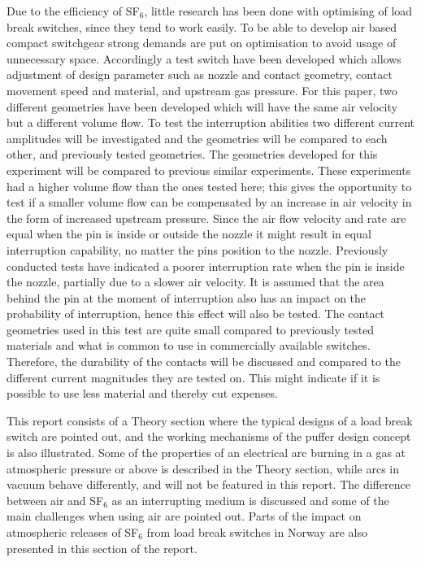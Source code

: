 \documentclass[10pt,a4paper,twoside]{article}
\begin{document}
Due to the efficiency of SF$_6$, little research has been done with optimising of load break switches, since they tend to work easily. To be able to develop air based compact switchgear strong demands are put on optimisation to avoid usage of unnecessary space. Accordingly a test switch have been developed which allows adjustment of design parameter such as nozzle and contact geometry, contact movement speed and material, and upstream gas pressure. For this paper, two different geometries have been developed which will have the same air velocity but a different volume flow. To test the interruption abilities two different current amplitudes will be investigated and the geometries will be compared to each other, and previously tested geometries. The geometries developed for this experiment will be compared to previous similar experiments. These experiments had a higher volume flow than the ones tested here; this gives the opportunity to test if a smaller volume flow can be compensated by an increase in air velocity in the form of increased upstream pressure. Since the air flow velocity and rate are equal when the pin is inside or outside the nozzle it might result in equal interruption capability, no matter the pins position to the nozzle. Previously conducted tests have indicated a poorer interruption rate when the pin is inside the nozzle, partially due to a slower air velocity. It is assumed that the area behind the pin at the moment of interruption also has an impact on the probability of interruption, hence this effect will also be tested. The contact geometries used in this test are quite small compared to previously tested materials and what is common to use in commercially available switches. Therefore, the durability of the contacts will be discussed and compared to the different current magnitudes they are tested on. This might indicate if it is possible to use less material and thereby cut expenses.

This report consists of a Theory section where the typical designs of a load break switch are pointed out, and the working mechanisms of the puffer design concept is also illustrated. Some of the properties of an electrical arc burning in a gas at atmospheric pressure or above is described in the Theory section, while arcs in vacuum behave differently, and will not be featured in this report. The difference between air and SF$_6$ as an interrupting medium is discussed and some of the main challenges when using air are pointed out. Parts of the impact on atmospheric releases of SF$_6$ from load break switches in Norway are also presented in this section of the report.
\end{document}
